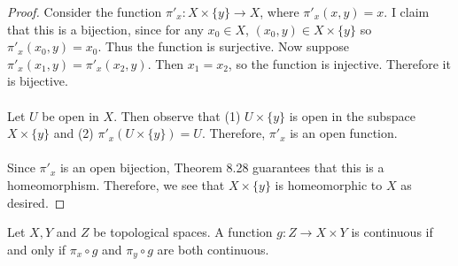 \documentclass[letter,12pt,twoside]{hmcpset}
\begin{document}
\begin{proof}
    Consider the function $\pi'_x: X \times \{y\} \to X$, where 
    $\pi'_x(x, y) = x$. I claim that this is a bijection, since for
    any $x_0 \in X$, $(x_0, y) \in X \times \{y\}$ so $\pi'_x (x_0, y) =
    x_0.$
    Thus the function is surjective.
    Now suppose $\pi'_x(x_1, y) = \pi'_x(x_2, y)$. Then $x_1 = x_2$,
    so the function is injective. Therefore it is bijective. 
    \\
    \\
    Let $U$ be open in $X$.
    Then observe that (1) $U \times \{y\}$ is open in the subspace $X
    \times \{y\}$ and (2) $\pi'_x (U \times \{y\}) = U$. Therefore,
    $\pi'_x$ is an open function.
    \\
    \\
    Since $\pi'_x$ is an open bijection, Theorem 8.28 guarantees that
    this is a homeomorphism. Therefore, we see that $X \times \{y\}$
    is homeomorphic to $X$ as desired.  
\end{proof}

\begin{problem}[Theorem 8.36]
    Let $X, Y$ and $Z$ be topological spaces. A function $g: Z
    \rightarrow X \times Y$ is continuous if and only if $\pi_x \circ
    g$ and $\pi_y \circ g$ are both continuous.
\end{problem} 
\end{document}
